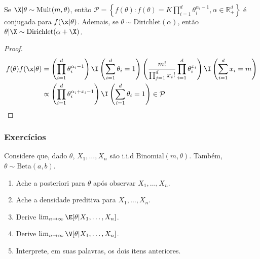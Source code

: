 \begin{lemma}
 \label{lemma:dirichlet-multinomial}
 Se $\X|\theta \sim \text{Mult}(m,\theta)$, então
 $\mathcal{P} = \left\{f(\theta): 
 f(\theta) = K\prod_{i=1}^d \theta_i^{\alpha_i-1},
 \alpha \in \mathbb{R}^{d}_{+}\right\}$ é
 conjugada para $f(\x|\theta)$. Ademais,
 se $\theta \sim \text{Dirichlet}(\alpha)$, então
 $\theta|\X \sim \text{Dirichlet}(\alpha + \X)$.
\end{lemma}

\begin{proof}
 \begin{align*}
  f(\theta)f(\x|\theta)
  &= \left(\prod_{i=1}^{d}\theta_i^{\alpha_i-1}\right)
  \I\left(\sum_{i=1}^d \theta_i = 1\right)
  \left( \frac{m!}
  {\prod_{j=1}^d x_i!}\prod_{i=1}^d\theta_i^{x_i}\right)
  \I\left(\sum_{i=1}^d x_i = m\right) \\
  &\propto  \left(\prod_{i=1}^d
  {\theta_i^{\alpha_i + x_i-1}}\right)
  \I\left(\sum_{i=1}^d \theta_i = 1\right)
  \in \mathcal{P}
 \end{align*}
\end{proof}

\subsubsection*{Exercícios}

\begin{exercise}
 Considere que, dado $\theta$, 
 $X_{1},\ldots,X_{n}$ são i.i.d 
 $\text{Binomial}(m,\theta)$.
 Também, $\theta \sim \text{Beta}(a,b)$.
 \begin{enumerate}[label=(\alph*)]
  \item Ache a posteriori para $\theta$ após 
  observar $X_{1},\ldots,X_{n}$.
  \item Ache a densidade preditiva para
  $X_{1},\ldots,X_{n}$.
  \item Derive $\lim_{n \rightarrow \infty}\E[\theta|X_{1},\ldots,X_{n}]$. 
  \item Derive $\lim_{n \rightarrow \infty}\V[\theta|X_{1},\ldots,X_{n}]$.
  \item Interprete, em suas palavras,
  os dois itens anteriores.
\end{enumerate}
\end{exercise}

